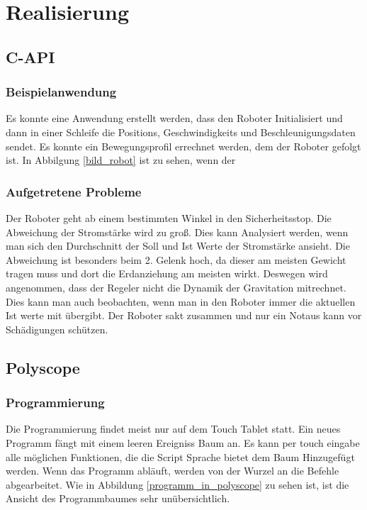 \chapter{Realisierung}
\label{chap:umsetzung}

\section{C-API}
\label{sec:capi_rel}

\subsection{Beispielanwendung}
\label{sub:capi-problems_rel}

Es konnte eine Anwendung erstellt werden, dass den Roboter Initialisiert und dann in einer Schleife die Positions, Geschwindigkeits und Beschleunigungsdaten sendet. Es konnte ein Bewegungsprofil errechnet werden, dem der Roboter gefolgt ist. In Abbilgung \ref{bild_robot} ist zu sehen, wenn der 

\subsection{Aufgetretene Probleme}
\label{sub:capi-problems_rel}

Der Roboter geht ab einem bestimmten Winkel in den Sicherheitsstop. Die Abweichung der Stromstärke wird zu groß. Dies kann Analysiert werden, wenn man sich den Durchschnitt der Soll und Ist Werte der Stromstärke ansieht. Die Abweichung ist besonders beim 2. Gelenk hoch, da dieser am meisten Gewicht tragen muss und dort die Erdanziehung am meisten wirkt. Deswegen wird angenommen, dass der Regeler nicht die Dynamik der Gravitation mitrechnet. Dies kann man auch beobachten, wenn man in den Roboter immer die aktuellen Ist werte mit übergibt. Der Roboter sakt zusammen und nur ein Notaus kann vor Schädigungen schützen.

\section{Polyscope}
\label{sec:Polyscope_rel}

\subsection{Programmierung}
\label{programmierung_polyscope_rel}

Die Programmierung findet meist nur auf dem Touch Tablet statt. Ein neues Programm fängt mit einem leeren Ereigniss Baum an. Es kann per touch eingabe alle möglichen Funktionen, die die Script Sprache bietet dem Baum Hinzugefügt werden. Wenn das Programm abläuft, werden von der Wurzel an die Befehle abgearbeitet.
Wie in Abbildung \ref{programm_in_polyscope} zu sehen ist, ist die Ansicht des Programmbaumes sehr unübersichtlich.

